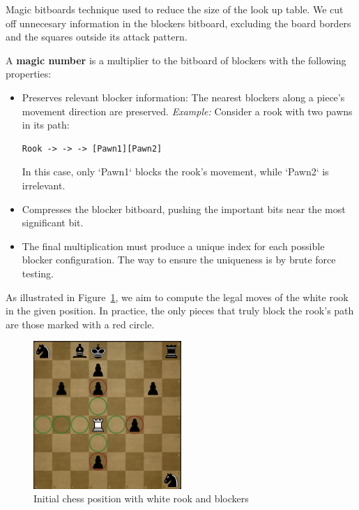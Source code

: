 \vspace{1em}

\noindent Magic bitboards technique used to reduce the size of the look up table. We cut off unnecesary information in the blockers bitboard, excluding the board borders and the squares outside its attack pattern.

\vspace{1em}

A \textbf{magic number} is a multiplier to the bitboard of blockers with the following properties:

\begin{itemize}
  \item Preserves relevant blocker information: 
  The nearest blockers along a piece's movement direction are preserved. 
  \textit{Example:} Consider a rook with two pawns in its path:
  \begin{lstlisting}[breaklines=true]
    Rook -> -> -> [Pawn1][Pawn2]
  \end{lstlisting}
  In this case, only `Pawn1` blocks the rook's movement, while `Pawn2` is irrelevant.
  \item Compresses the blocker bitboard, pushing the important bits near the most significant bit.
  \item The final multiplication must produce a unique index for each possible blocker configuration. The way to ensure the uniqueness is by brute force testing.
\end{itemize}

\noindent As illustrated in Figure~\ref{fig:magics_position}, we aim to compute the legal moves of the white rook in the given position. In practice, the only pieces that truly block the rook's path are those marked with a red circle.

\begin{figure}[H]
    \centering
    \includegraphics[width=0.5\textwidth]{Imagenes/magics_position.png}
    \caption{Initial chess position with white rook and blockers}
    \label{fig:magics_position}
\end{figure}

